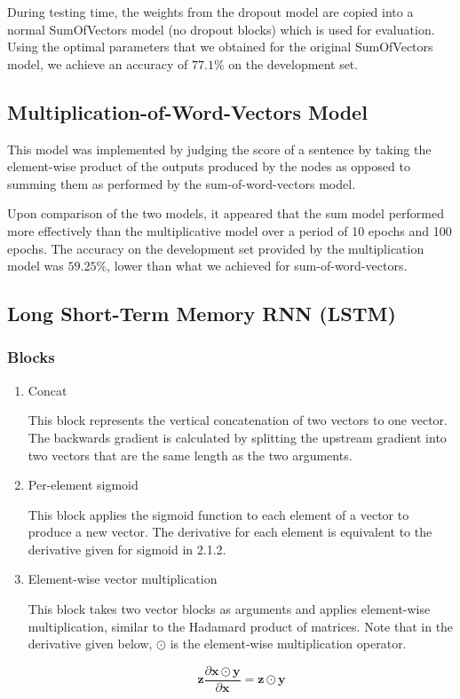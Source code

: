 \documentclass{article} %
\begin{document}
During testing time, the weights from the dropout model are copied into a normal SumOfVectors model (no dropout blocks) which is used for evaluation. Using the optimal parameters that we obtained for the original SumOfVectors model, we achieve an accuracy of $77.1\%$ on the development set.

\subsection{Multiplication-of-Word-Vectors Model}

This model was implemented by judging the score of a sentence by taking the element-wise product of the outputs produced by the nodes as opposed to summing them as performed by the sum-of-word-vectors model. 

Upon comparison of the two models, it appeared that the sum model performed more effectively than the multiplicative model over a period of 10 epochs and 100 epochs. The accuracy on the development set provided by the multiplication model was $59.25\%$, lower than what we achieved for sum-of-word-vectors.

\subsection{Long Short-Term Memory RNN (LSTM)}

\subsubsection{Blocks}

\begin{enumerate}

\item Concat

This block represents the vertical concatenation of two vectors to one vector. The backwards gradient is calculated by splitting the upstream gradient into two vectors that are the same length as the two arguments.

\item

Per-element sigmoid

This block applies the sigmoid function to each element of a vector to produce a new vector. The derivative for each element is equivalent to the derivative given for sigmoid in 2.1.2.

\item

Element-wise vector multiplication

This block takes two vector blocks as arguments and applies element-wise multiplication, similar to the Hadamard product of matrices. Note that in the derivative given below, $\odot$ is the element-wise multiplication operator.

\[
\mathbf{z} \frac{\partial \mathbf{x} \odot \mathbf{y}}{\partial \mathbf{x}} = \mathbf{z} \odot \mathbf{y}
\]

\end{enumerate}
\end{document}

